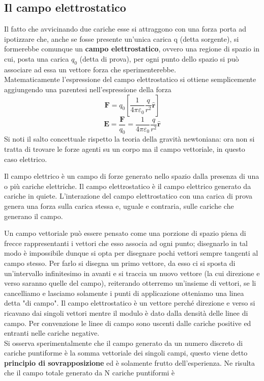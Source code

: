 \documentclass[
10pt, %
a4paper, %
oneside, %
headinclude,footinclude, %
BCOR5mm, %
]{scrartcl}
\begin{document}
\subsection{Il campo elettrostatico}
Il fatto che avvicinando due cariche esse si attraggono con una forza porta ad ipotizzare che, anche se fosse presente un'unica carica q (detta sorgente), si formerebbe comunque un \textbf{campo elettrostatico}, ovvero una regione di spazio in cui, posta una carica \(q_0\) (detta di prova), per ogni punto dello spazio si può associare ad essa un vettore forza che sperimenterebbe.\\
Matematicamente l'espressione del campo elettrostatico si ottiene semplicemente aggiungendo una parentesi nell'espressione della forza 
\[\mathbf{F}=q_0\left[\frac{1}{4\pi\varepsilon_0}\frac{q}{r^2}\hat{\mathbf{r}}\right]\]
\[\mathbf{E} = \frac{\mathbf{F}}{q_0} = \frac{1}{4\pi\varepsilon_0}\frac{q}{r^2}\hat{\mathbf{r}}\]
Si noti il salto concettuale rispetto la teoria della gravità newtoniana: ora non si tratta di trovare le forze agenti su un corpo ma il campo vettoriale, in questo caso elettrico.
\begin{definizione}
	 Il campo elettrico è un campo di forze generato nello spazio dalla presenza di una o più cariche elettriche. Il campo elettrostatico è il campo elettrico generato da cariche in quiete. L'interazione del campo elettrostatico con una carica di prova genera una forza sulla carica stessa e, uguale e contraria, sulle cariche che generano il campo.
\end{definizione}
Un campo vettoriale può essere pensato come una porzione di spazio piena di frecce rappresentanti i vettori che esso associa ad ogni punto; disegnarlo in tal modo è impossibile dunque si opta per disegnare pochi vettori sempre tangenti al campo stesso. Per farlo si disegna un primo vettore, da esso ci si sposta di un'intervallo infinitesimo in avanti e si traccia un nuovo vettore (la cui direzione e verso saranno quelle del campo), reiterando otterremo un'insieme di vettori, se li cancelliamo e lasciamo solamente i punti di applicazione otteniamo una linea detta "di campo". Il campo elettrostatico è un vettore perché direzione e verso si ricavano dai singoli vettori mentre il modulo è dato dalla densità delle linee di campo. Per convenzione le linee di campo sono uscenti dalle cariche positive ed entranti nelle cariche negative.\\
Si osserva sperimentalmente che il campo generato da un numero discreto di cariche puntiforme è la somma vettoriale dei singoli campi, questo viene detto \textbf{principio di sovrapposizione} ed è solamente frutto dell'esperienza. Ne risulta che il campo totale generato da N cariche puntiformi è
\end{document}
